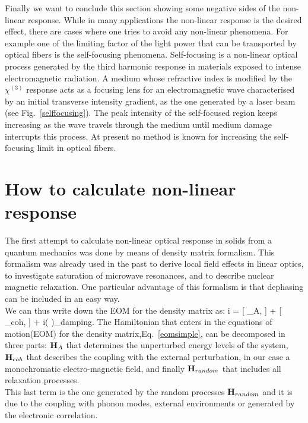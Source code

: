 Finally we want to conclude this section showing some negative sides of the non-linear response. While in many applications the non-linear response is the desired effect, there are cases where one tries to avoid any non-linear phenomena. 
For example one of the limiting factor of the light power that can be transported by optical fibers is the self-focusing phenomena. Self-focusing is a non-linear optical process generated by the third harmonic response in materials exposed to intense electromagnetic radiation. 
A medium whose refractive index is modified by the $\chi^{(3)}$ response acts as a focusing lens for an electromagnetic wave characterised by an initial transverse intensity gradient, as the one generated by a laser beam (see Fig.~\ref{selffocusing}). 
The peak intensity of the self-focused region keeps increasing as the wave travels through the medium until medium damage interrupts this process. At present no method is known for increasing the self-focusing limit in optical fibers\cite{encylaser}.
\section{How to calculate non-linear response}
The first attempt to calculate non-linear optical response in solids from a quantum mechanics was done by means of density matrix formalism.\cite{bloembergen1964quantum} This formalism was already used in the past to derive local field effects in linear optics\cite{PhysRev.126.413,wiser1963dielectric}, to investigate  saturation of microwave resonances\cite{karplus1948note}, and to describe nuclear magnetic relaxation\cite{kubo1954general,RevModPhys.33.249,PhysRev.102.104}.              
One particular advantage of this formalism is that dephasing can be included in an easy way.\cite{manzano2020short}\\  
We can thus write down the EOM for the density matrix as:
\be
i \hbar {} = [ \HH_A, \rho] + [ \HH_{coh}, \rho] + i\hbar \left (  \right )_{damping}.
\label{eomsimple}
\ee
The Hamiltonian that enters in the equations of motion(EOM) for the density matrix\cite{neumann},Eq.~\ref{eomsimple}, can be decomposed in three parts:   ${\bf H}_A$ that determines the unperturbed energy levels of the system, ${\bf H}_{coh}$ that describes the coupling  with the external perturbation, in our case a monochromatic electro-magnetic field, and finally ${\bf H}_{random}$ that includes all relaxation processes.\\
This last term is the one generated by the random processes  ${\bf H}_{random}$ and it is due to the coupling with phonon modes, external environments or generated by the electronic correlation. 

